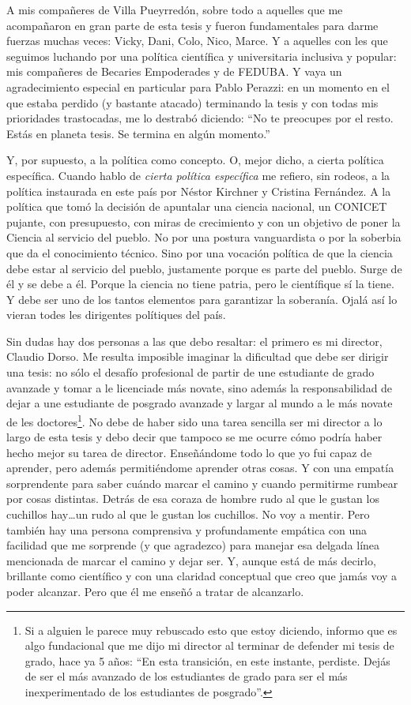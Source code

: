A mis compañeres de Villa Pueyrredón, sobre todo a aquelles que me acompañaron en gran parte de esta tesis y fueron fundamentales para darme fuerzas muchas veces: Vicky, Dani, Colo, Nico, Marce.
Y a aquelles con les que seguimos luchando por una política científica y universitaria inclusiva y popular: mis compañeres de Becaries Empoderades y de FEDUBA.
Y vaya un agradecimiento especial en particular para Pablo Perazzi: en un momento en el que estaba perdido (y bastante atacado) terminando la tesis y con todas mis prioridades trastocadas, me lo destrabó diciendo: ``No te preocupes por el resto. Estás en planeta tesis. Se termina en algún momento.''

Y, por supuesto, a la política como concepto.
O, mejor dicho, a cierta política específica.
Cuando hablo de \emph{cierta política específica} me refiero, sin rodeos, a la política instaurada en este país por Néstor Kirchner y Cristina Fernández.
A la política que tomó la decisión de apuntalar una ciencia nacional, un CONICET pujante, con presupuesto, con miras de crecimiento y con un objetivo de poner la Ciencia al servicio del pueblo.
No por una postura vanguardista o por la soberbia que da el conocimiento técnico.
Sino por una vocación política de que la ciencia debe estar al servicio del pueblo, justamente porque es parte del pueblo.
Surge de él y se debe a él.
Porque la ciencia no tiene patria, pero le científique sí la tiene.
Y debe ser uno de los tantos elementos para garantizar la soberanía.
Ojalá así lo vieran todes les dirigentes polítiques del país.

Sin dudas hay dos personas a las que debo resaltar: el primero es mi director, Claudio Dorso.
Me resulta imposible imaginar la dificultad que debe ser dirigir una tesis: no sólo el desafío profesional de partir de une estudiante de grado avanzade y tomar a le licenciade más novate, sino además la responsabilidad de dejar a une estudiante de posgrado avanzade y largar al mundo a le más novate de les doctores\footnote{Si a alguien le parece muy rebuscado esto que estoy diciendo, informo que es algo fundacional que me dijo mi director al terminar de defender mi tesis de grado, hace ya 5 años: ``En esta transición, en este instante, perdiste. Dejás de ser el más avanzado de los estudiantes de grado para ser el más inexperimentado de los estudiantes de posgrado''.}.
No debe de haber sido una tarea sencilla ser mi director a lo largo de esta tesis y debo decir que tampoco se me ocurre cómo podría haber hecho mejor su tarea de director.
Enseñándome todo lo que yo fui capaz de aprender, pero además permitiéndome aprender otras cosas.
Y con una empatía sorprendente para saber cuándo marcar el camino y cuando permitirme rumbear por cosas distintas.
Detrás de esa coraza de hombre rudo al que le gustan los cuchillos hay\ldots un rudo al que le gustan los cuchillos.
No voy a mentir.
Pero también hay una persona comprensiva y profundamente empática con una facilidad que me sorprende (y que agradezco) para manejar esa delgada línea mencionada de marcar el camino y dejar ser.
Y, aunque está de más decirlo, brillante como científico y con una claridad conceptual que creo que jamás voy a poder alcanzar.
Pero que él me enseñó a tratar de alcanzarlo.

